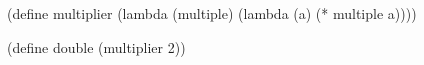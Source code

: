 \begin{minipage}{3in}
  \begin{AVerb}[gobble=4,numbers=left]
    (define multiplier \label{lang_fig2_scheme_fun}
      (lambda (multiple)  
        (lambda (a) (* multiple a))))

    (define double \label{lang_fig2_scheme_double}
      (multiplier 2))
  \end{AVerb}
\end{minipage}
